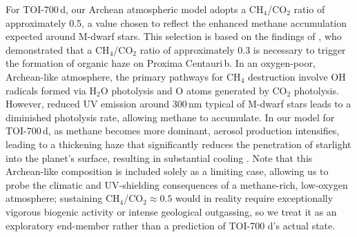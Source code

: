 For TOI-700\,d, our Archean atmospheric model adopts a CH$_4$/CO$_2$ ratio of approximately 0.5, a value chosen to reflect the enhanced methane accumulation expected around M-dwarf stars. This selection is based on the findings of \cite{Meadows.et.al.2018}, who demonstrated that a CH$_4$/CO$_2$ ratio of approximately 0.3 is necessary to trigger the formation of organic haze on Proxima Centauri\,b. 
In an oxygen-poor, Archean-like atmosphere, the primary pathways for CH$_4$ destruction involve OH radicals formed via H$_2$O photolysis and O atoms generated by CO$_2$ photolysis.
However, reduced UV emission around 300\,nm typical of M-dwarf stars leads to a diminished photolysis rate, allowing methane to accumulate. In our model for TOI-700\,d, as methane becomes more dominant, aerosol production intensifies, leading to a thickening haze that significantly reduces the penetration of starlight into the planet's surface, resulting in substantial cooling \citep[see][]{Haqq-Misra.et.al.2008AsBio...8.1127H}.
Note that this Archean-like composition is included solely as a limiting case, allowing us to probe the climatic and UV-shielding consequences of a methane-rich, low-oxygen atmosphere; sustaining CH$_4$/CO$_2 \approx 0.5$ would in reality require exceptionally vigorous biogenic activity or intense geological outgassing, so we treat it as an exploratory end-member rather than a prediction of TOI-700 d’s actual state.

